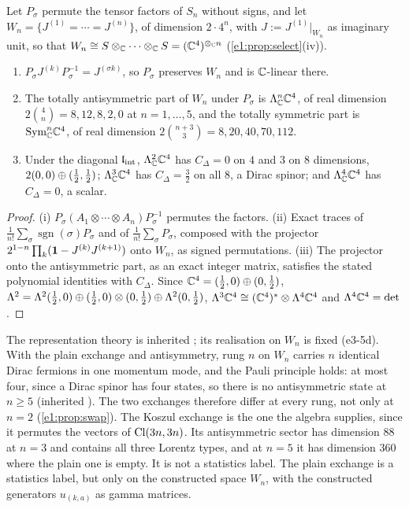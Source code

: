 \begin{proposition}
\label{e3:prop:ungraded}
Let $P_\sigma$ permute the tensor factors of $S_n$ without signs, and let $W_n=\{J^{(1)}=\cdots=J^{(n)}\}$, of dimension $2\cdot4^n$, with $J:=J^{(1)}|_{W_n}$ as
imaginary unit, so that $W_n\cong S\otimes_{\mathbb{C}}\cdots\otimes_{\mathbb{C}} S=(\mathbb{C}^4)^{\otimes_{\mathbb{C}} n}$ (\cref{e1:prop:select}(iv)).
\begin{enumerate}[label=(\roman*),leftmargin=2.2em]
\item $P_\sigma J^{(k)}P_\sigma^{-1}=J^{(\sigma k)}$, so $P_\sigma$ preserves $W_n$ and is $\mathbb{C}$-linear there.
\item The totally antisymmetric part of $W_n$ under $P_\sigma$ is $\Lambda^n_{\mathbb{C}}\mathbb{C}^4$, of real dimension $2\binom4n=8,12,8,2,0$ at $n=1,\dots,5$, and the
totally symmetric part is $\mathrm{Sym}^n_{\mathbb{C}}\mathbb{C}^4$, of real dimension $2\binom{n+3}3=8,20,40,70,112$.
\item Under the diagonal $\mathfrak l_{\rm int}$, $\Lambda^2_{\mathbb{C}}\mathbb{C}^4$ has $C_\Delta=0$ on $4$ and $3$ on $8$ dimensions, $2(0,0)\oplus(\tfrac12,\tfrac12)$; $\Lambda^3_{\mathbb{C}}\mathbb{C}^4$ has
$C_\Delta=\tfrac32$ on all $8$, a Dirac spinor; and $\Lambda^4_{\mathbb{C}}\mathbb{C}^4$ has $C_\Delta=0$, a scalar.
\end{enumerate}
\end{proposition}

\begin{proof}
(i) $P_\sigma(A_1\otimes\cdots\otimes A_n)P_\sigma^{-1}$ permutes the factors. (ii) Exact traces of $\frac1{n!}\sum_\sigma\operatorname{sgn}(\sigma)P_\sigma$ and of $\frac1{n!}\sum_\sigma P_\sigma$, composed with the projector
$2^{1-n}\prod_k(\mathbf 1-J^{(k)}J^{(k+1)})$ onto $W_n$, as signed permutations. (iii) The projector onto the antisymmetric part, as an exact integer matrix,
satisfies the stated polynomial identities with $C_\Delta$. Since $\mathbb{C}^4=(\tfrac12,0)\oplus(0,\tfrac12)$,
$\Lambda^2=\Lambda^2(\tfrac12,0)\oplus(\tfrac12,0)\otimes(0,\tfrac12)\oplus\Lambda^2(0,\tfrac12)$, $\Lambda^3\mathbb{C}^4\cong(\mathbb{C}^4)^*\otimes\Lambda^4\mathbb{C}^4$ and $\Lambda^4\mathbb{C}^4=\det$.
\end{proof}

The representation theory is inherited \cite{WeinbergQFT}; its realisation on $W_n$ is fixed (e3-5d). With the plain exchange and
antisymmetry, rung $n$ on $W_n$ carries $n$ identical Dirac fermions in one momentum mode, and the Pauli principle holds: at most four, since a
Dirac spinor has four states, so there is no antisymmetric state at $n\ge5$ (inherited \cite{Pauli40}). The two exchanges therefore differ at
every rung, not only at $n=2$ (\cref{e1:prop:swap}). The Koszul exchange is the one the algebra supplies, since it permutes the vectors of
$\mathrm{Cl}(3n,3n)$. Its antisymmetric sector has dimension $88$ at $n=3$ and contains all three Lorentz types, and at $n=5$ it has dimension $360$
where the plain one is empty. It is not a statistics label. The plain exchange is a statistics label, but only on the constructed space $W_n$,
with the constructed generators $u_{(k,a)}$ as gamma matrices.

